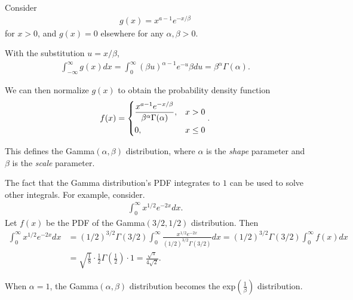 \begin{exmp}
    Consider
    \begin{align*}
        g(x) = x^{a-1}e^{-x/\beta}
    \end{align*}
    for $x > 0$, and $g(x) = 0$ elsewhere for any $\alpha, \beta > 0$.

    With the substitution $u = x/\beta$,
    \begin{align*}
        \int_{-\infty}^{\infty}g(x)dx = \int_{0}^{\infty}(\beta u)^{\alpha -1}e^{-u}\beta du = \beta^{\alpha}\Gamma(\alpha).
    \end{align*}

    We can then normalize $g(x)$ to obtain the probability density function
    \begin{align*}
        f(x) = \begin{dcases}
            \frac{x^{a-1}e^{-x/\beta}}{\beta^{\alpha}\Gamma(\alpha)}, & x > 0 \\
            0, & x \leq 0
        \end{dcases}.
    \end{align*}

    This defines the Gamma$(\alpha, \beta)$ distribution, where $\alpha$ is the \emph{shape} parameter and $\beta$ is the \emph{scale} parameter.
\end{exmp}

\begin{rmk}
    The fact that the Gamma distribution's PDF integrates to $1$ can be used to solve other integrals. For example, consider.
    \begin{align*}
        \int_{0}^{\infty}x^{1/2}e^{-2x}dx.
    \end{align*}
    Let $f(x)$ be the PDF of the Gamma$(3/2, 1/2)$ distribution. Then
    \begin{align*}
        \int_{0}^{\infty}x^{1/2}e^{-2x}dx &= (1/2)^{3/2}\Gamma(3/2)\int_{0}^{\infty}\frac{x^{1/2}e^{-2x}}{(1/2)^{3/2}\Gamma(3/2)}dx = (1/2)^{3/2}\Gamma(3/2)\int_{0}^{\infty}f(x)dx \\
        &= \sqrt{\frac{1}{8}} \cdot \frac{1}{2}\Gamma\left(\frac{1}{2}\right) \cdot 1 = \frac{\sqrt{\pi}}{4\sqrt{2}}.
    \end{align*}
\end{rmk}

\begin{rmk}
    When $\alpha = 1$, the Gamma$(\alpha, \beta)$ distribution becomes the exp$\left(\frac{1}{\beta}\right)$ distribution.
\end{rmk}

